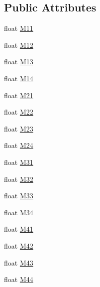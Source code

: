\subsection*{Public Attributes}
\begin{DoxyCompactItemize}
\item 
float \hyperlink{structMicrosoft_1_1Xna_1_1Framework_1_1Matrix_a6e0df079c8040c77769a309466864454}{M11}
\item 
float \hyperlink{structMicrosoft_1_1Xna_1_1Framework_1_1Matrix_afe20477d8178d25f6cd27363c66f455f}{M12}
\item 
float \hyperlink{structMicrosoft_1_1Xna_1_1Framework_1_1Matrix_a065a58e31cd9a7078f9976cd2b6df5d3}{M13}
\item 
float \hyperlink{structMicrosoft_1_1Xna_1_1Framework_1_1Matrix_a8363a93e906d2fb3a253959ef2685802}{M14}
\item 
float \hyperlink{structMicrosoft_1_1Xna_1_1Framework_1_1Matrix_a55337820e556a3bfd442af734b2463eb}{M21}
\item 
float \hyperlink{structMicrosoft_1_1Xna_1_1Framework_1_1Matrix_a4debbae58358d5be48c1f31f130e5ff2}{M22}
\item 
float \hyperlink{structMicrosoft_1_1Xna_1_1Framework_1_1Matrix_a6494dafc117f6d4c0afe0f96a9a4195d}{M23}
\item 
float \hyperlink{structMicrosoft_1_1Xna_1_1Framework_1_1Matrix_ac624222cadd4ad3e7cfebc4472e90ce8}{M24}
\item 
float \hyperlink{structMicrosoft_1_1Xna_1_1Framework_1_1Matrix_a5d11c2633d986d65f5f0700088e779af}{M31}
\item 
float \hyperlink{structMicrosoft_1_1Xna_1_1Framework_1_1Matrix_ab04f5b32c7a647761dfbd27239db402a}{M32}
\item 
float \hyperlink{structMicrosoft_1_1Xna_1_1Framework_1_1Matrix_a39ae48cd8ed1f61eaee2557d79c0c297}{M33}
\item 
float \hyperlink{structMicrosoft_1_1Xna_1_1Framework_1_1Matrix_ac1aef4a448271a1e1df230793ec231c0}{M34}
\item 
float \hyperlink{structMicrosoft_1_1Xna_1_1Framework_1_1Matrix_afec4d2f5bdb72e7801bc9c9fffba3c2b}{M41}
\item 
float \hyperlink{structMicrosoft_1_1Xna_1_1Framework_1_1Matrix_a74f9f871a752f2487aed6cec6a1be6e3}{M42}
\item 
float \hyperlink{structMicrosoft_1_1Xna_1_1Framework_1_1Matrix_a915c2cdb3fab4c1d4ec29c30d305057e}{M43}
\item 
float \hyperlink{structMicrosoft_1_1Xna_1_1Framework_1_1Matrix_af0b449cfecbcf03663c74a3a37358e19}{M44}
\end{DoxyCompactItemize}
